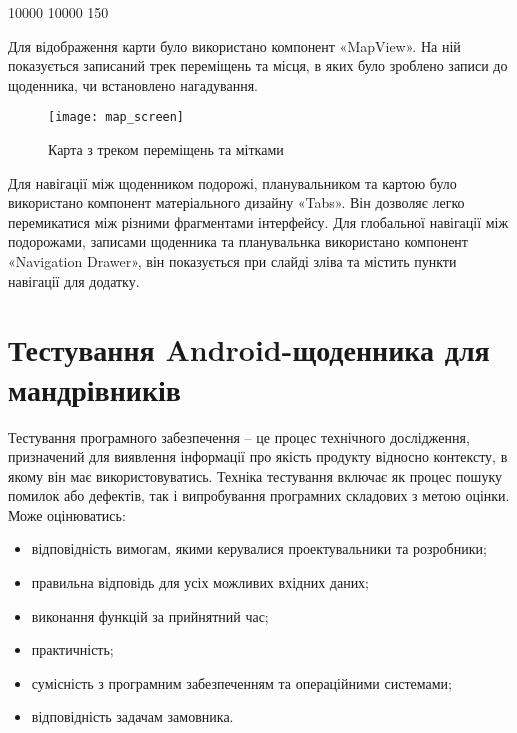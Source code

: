 \documentclass[../main.tex]{subfiles}
\begin{document}
{	
 10000 10000 150

Для відображення карти було використано компонент «MapView». На ній показується записаний трек переміщень та місця, в яких було зроблено записи до щоденника, чи встановлено нагадування.

}

\begin{figure}[H]
	\centering
	\texttt{[image: map\_screen]}
	\caption{Карта з треком переміщень та мітками}
	\label{figure:map_screen}
\end{figure}

Для навігації між щоденником подорожі, планувальником та картою було використано компонент матеріального дизайну «Tabs». Він дозволяє легко перемикатися між різними фрагментами інтерфейсу. Для глобальної навігації між подорожами, записами щоденника та планувальнка використано компонент «Navigation Drawer», він показується при слайді зліва та містить пункти навігації для додатку. 


\section{Тестування Android-щоденника для мандрівників}

Тестування програмного забезпечення -- це процес технічного дослідження, призначений для виявлення інформації про якість продукту відносно контексту, в якому він має використовуватись. Техніка тестування включає як процес пошуку помилок або дефектів, так і випробування програмних складових з метою оцінки. Може оцінюватись:

\begin{itemize}[label={--}]
	\item відповідність вимогам, якими керувалися проектувальники та розробники;
	\item правильна відповідь для усіх можливих вхідних даних;
	\item виконання функцій за прийнятний час;
	\item практичність;
	\item сумісність з програмним забезпеченням та операційними системами;
	\item відповідність задачам замовника.
\end{itemize}
\end{document}
